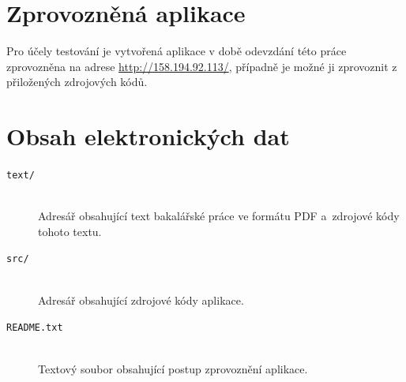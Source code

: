 \documentclass[
  biblatex,
  sourcecodes,
  glossaries,
  index
]{kidiplom}
\begin{document}
\section{Zprovozněná aplikace}

Pro účely testování je vytvořená aplikace v době odevzdání této práce zprovozněna na adrese \href{http://158.194.92.113/}{http://158.194.92.113/}, případně je možné ji zprovoznit z přiložených zdrojových kódů.

\section{Obsah elektronických dat} \label{sec:ObsahData}

\begin{description}

\item[\texttt{text/}] \hfill \\
  Adresář obsahující text bakalářské práce ve formátu PDF a~zdrojové kódy tohoto textu.

\item[\texttt{src/}] \hfill \\
  Adresář obsahující zdrojové kódy aplikace.

\item[\texttt{README.txt}] \hfill \\
  Textový soubor obsahující postup zprovoznění aplikace.

\end{description}





\nocite{*}
\printbibliography

\printindex
\end{document}
